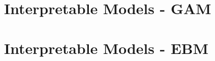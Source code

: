\documentclass[11pt,compress,t,notes=noshow, aspectratio=169, xcolor=table]{beamer}
\begin{document}


%
%
%

\section{Interpretable Models - GAM}

%

\section{Interpretable Models - EBM}

\end{document}
